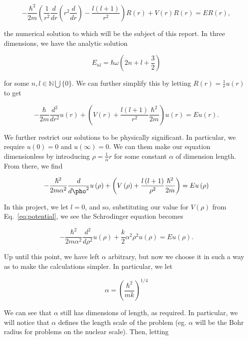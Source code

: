 \documentclass[12pt]{article}
\numberwithin{equation}{section}
\begin{document}
\begin{equation}
\label{eq:schrodrad}
-\frac{\hbar^{2}}{2m}\left(\frac{1}{r^{2}}\frac{d}{dr}\left(r^{2}\frac{d}{dr}\right)-\frac{l\left(l+1\right)}{r^{2}}\right)R\left(r\right)+V\left(r\right)R\left(r\right)=ER\left(r\right),
\end{equation}

\noindent the numerical solution to which will be the subject of this report.  In three dimensions, we have the analytic solution

\begin{equation}
\label{eq:schrodsol}
E_{nl}=\hbar\omega\left(2n+l+\frac{3}{2}\right)
\end{equation}

\noindent for some $n,l\in\mathbb{N}\bigcup\{0\}$.  We can further simplify this by letting $R\left(r\right)=\frac{1}{r}u\left(r\right)$ to get

$$-\frac{\hbar}{2m}\frac{d^{2}}{dr^{2}}u\left(r\right)+\left(V\left(r\right)+\frac{l\left(l+1\right)}{r^{2}}\frac{\hbar^{2}}{2m}\right)u\left(r\right)=Eu\left(r\right).$$

\noindent We further restrict our solutions to be physically significant.  In particular, we require $u\left(0\right)=0$ and $u\left(\infty\right)=0$.  We can them make our equation dimensionless by introducing $\rho=\frac{1}{\alpha}r$ for some constant $\alpha$ of dimension length.  From there, we find

$$-\frac{\hbar^{2}}{2m\alpha^{2}}\frac{d}{d\pho^2}u\left(\rho\right)+\left(V\left(\rho\right)+\frac{l\left(l+1\right)}{\rho^{2}}\frac{\hbar^{2}}{2m}\right)=Eu\left(\rho\right)$$

\noindent In this project, we let $l=0$, and so, substituting our value for $V\left(\rho\right)$ from Eq.~\ref{eq:potential}, we see the Schrodinger equation becomes

$$-\frac{\hbar^{2}}{2m\alpha^{2}}\frac{d^{2}}{d\rho^{2}}u\left(\rho\right)+\frac{k}{2}\alpha^{2}\rho^{2}u\left(\rho\right)=Eu\left(\rho\right).$$

\indent Up until this point, we have left $\alpha$ arbitrary, but now we choose it in such a way as to make the calculations simpler.  In particular, we let 

\begin{equation}
\label{eq:alpha}
\alpha=\left(\frac{\hbar^{2}}{mk}\right)^{1/4}
\end{equation}

\noindent We can see that $\alpha$ still has dimensions of length, as required.  In particular, we will notice that $\alpha$ defines the length scale of the problem (eg. $\alpha$ will be the Bohr radius for problems on the nuclear scale).  Then, letting
\end{document}
